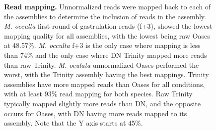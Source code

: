 \begin{figure}[!ht]
	\hfill
	\caption{\textbf{Read mapping.} Unnormalized reads were mapped back to each of the assemblies to determine the inclusion of reads in the assembly. \textit{M. occulta} first round of gastrulation reads (f+3), showed the lowest mapping quality for all assemblies, with the lowest being raw Oases at 48.57\%. \textit{M. occulta} f+3 is the only case where mapping is less than 74\% and the only case where DN Trinity mapped more reads than raw Trinity. \textit{M. oculata} unnormalized Oases performed the worst, with the Trinity assembly having the best mappings. Trinity assemblies have more mapped reads than Oases for all conditions, with at least 93\% read mapping for both species. Raw Trinity typically mapped slightly more reads than DN, and the opposite occurs for Oases, with DN having more reads mapped to its assembly.  Note that the Y axis starts at 45\%.}
	\label{fig:read_mapping}
\end{figure}

